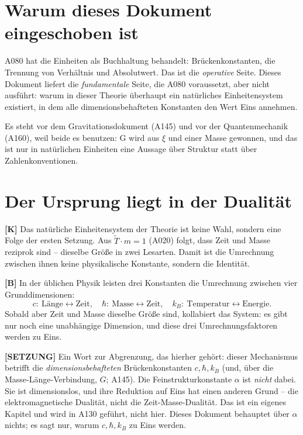 \section{Warum dieses Dokument eingeschoben ist}

A080 hat die Einheiten als Buchhaltung behandelt: Brückenkonstanten, die
Trennung von Verhältnis und Absolutwert. Das ist die \emph{operative} Seite.
Dieses Dokument liefert die \emph{fundamentale} Seite, die A080 voraussetzt,
aber nicht ausführt: warum in dieser Theorie überhaupt ein natürliches
Einheitensystem existiert, in dem alle dimensionsbehafteten Konstanten den Wert
Eins annehmen.

Es steht vor dem Gravitationsdokument (A145) und vor der Quantenmechanik (A160),
weil beide es benutzen: G wird aus $\xi$ und einer Masse gewonnen, und das ist
nur in natürlichen Einheiten eine Aussage über Struktur statt über
Zahlenkonventionen.

\section{Der Ursprung liegt in der Dualität}

\textbf{[K]} Das natürliche Einheitensystem der Theorie ist keine Wahl, sondern
eine Folge der ersten Setzung. Aus $\tilde T\cdot m = 1$ (A020) folgt, dass
Zeit und Masse reziprok sind -- dieselbe Größe in zwei Lesarten. Damit ist die
Umrechnung zwischen ihnen keine physikalische Konstante, sondern die Identität.

\textbf{[B]} In der üblichen Physik leisten drei Konstanten die Umrechnung
zwischen vier Grunddimensionen:
\[
  c:\ \text{Länge}\leftrightarrow\text{Zeit},\quad
  \hbar:\ \text{Masse}\leftrightarrow\text{Zeit},\quad
  k_B:\ \text{Temperatur}\leftrightarrow\text{Energie}.
\]
Sobald aber Zeit und Masse dieselbe Größe sind, kollabiert das System: es gibt
nur noch eine unabhängige Dimension, und diese drei Umrechnungsfaktoren werden
zu Eins.

\textbf{[SETZUNG]} Ein Wort zur Abgrenzung, das hierher gehört: dieser
Mechanismus betrifft die \emph{dimensionsbehafteten} Brückenkonstanten
$c, \hbar, k_B$ (und, über die Masse-Länge-Verbindung, $G$; A145). Die
Feinstrukturkonstante $\alpha$ ist \emph{nicht} dabei. Sie ist dimensionslos,
und ihre Reduktion auf Eins hat einen anderen Grund -- die elektromagnetische
Dualität, nicht die Zeit-Masse-Dualität. Das ist ein eigenes Kapitel und wird in
A130 geführt, nicht hier. Dieses Dokument behauptet über $\alpha$ nichts; es
sagt nur, warum $c, \hbar, k_B$ zu Eins werden.

